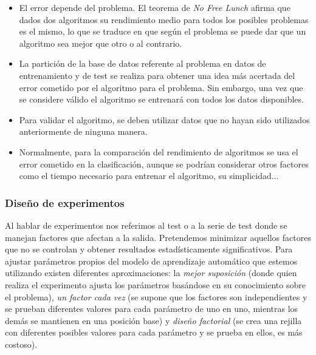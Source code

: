 	\begin{itemize}
	\item El error depende del problema. El teorema de 
		\textit{No Free Lunch} afirma que dados dos 
		algoritmos su rendimiento medio para todos los 
		posibles problemas es el mismo, lo que se traduce en 
		que según el problema se puede dar que un algoritmo 
		sea mejor que otro o al contrario.
	\item La partición de la base de datos referente al 
		problema en datos de entrenamiento y de test se 
		realiza para obtener una idea más acertada del error 
		cometido por el algoritmo para el problema. Sin 
		embargo, una vez que se considere válido el algoritmo 
		se entrenará con todos los datos disponibles.
	\item Para validar el algoritmo, se deben utilizar datos 
		que no hayan sido utilizados anteriormente de ninguna 
		manera.
	\item Normalmente, para la comparación del rendimiento de 
		algoritmos se usa el error cometido en la 
		clasificación, aunque se podrían considerar otros 
		factores como el tiempo necesario para entrenar el 
		algoritmo, su simplicidad...
	\end{itemize}
	
\subsubsection{Diseño de experimentos}

	Al hablar de experimentos nos referimos al test o a la 
serie de test donde se manejan factores que afectan a la 
salida. Pretendemos minimizar aquellos factores que no se 
controlan y obtener resultados estadísticamente 
significativos. Para ajustar parámetros propios del modelo de 
aprendizaje automático que estemos utilizando existen 
diferentes aproximaciones: la \textit{mejor suposición} 
(donde quien realiza el experimento ajusta los parámetros 
basándose en su conocimiento sobre el problema), \textit{un 
factor cada vez} (se supone que los factores son 
independientes y se prueban diferentes valores para cada 
parámetro de uno en uno, mientras los demás se mantienen en 
una posición base) y \textit{diseño factorial} (se crea una 
rejilla con diferentes posibles valores para cada parámetro y 
se prueba en ellos, es más costoso).\\

